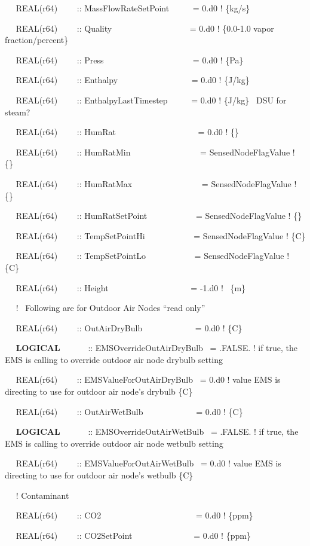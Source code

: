 ~~ REAL(r64)~~~~ :: MassFlowRateSetPoint~~~~~ = 0.d0 ! \{kg/s\}

~~ REAL(r64)~~~~ :: Quality~~~~~~~~~~~~~~~~~~ = 0.d0 ! \{0.0-1.0 vapor fraction/percent\}

~~ REAL(r64)~~~~ :: Press~~~~~ ~~~~~~~~~~~~~~~ = 0.d0 ! \{Pa\}

~~ REAL(r64)~~~~ :: Enthalpy~~~~~~~~~~~~~~~~~ = 0.d0 ! \{J/kg\}

~~ REAL(r64)~~~~ :: EnthalpyLastTimestep~~~~~ = 0.d0 ! \{J/kg\}~ DSU for steam?

~~ REAL(r64)~~~~ :: HumRat~~~~~~~~~~~~~~~~~~~ = 0.d0 ! \{\}

~~ REAL(r64)~~~~ :: HumRatMin~~~~~~~~~~~~~~~~ = SensedNodeFlagValue ! \{\}

~~ REAL(r64)~~~~ :: HumRatMax~~~~~~~~~~~~~~~~ = SensedNodeFlagValue ! \{\}

~~ REAL(r64)~~~~ :: HumRatSetPoint~~~~~~~~~~~ = SensedNodeFlagValue ! \{\}

~~ REAL(r64)~~~~ :: TempSetPointHi~~~~~~~~~~~ = SensedNodeFlagValue ! \{C\}

~~ REAL(r64)~~~~ :: TempSetPointLo~~~~~~~~~~~ = SensedNodeFlagValue ! \{C\}

~~ REAL(r64)~~~~ :: Height~~~~~~~~~~~~~~~~~~~ = -1.d0 !~ \{m\}

~~ !~ Following are for Outdoor Air Nodes ``read only''

~~ REAL(r64)~~~~ :: OutAirDryBulb~~~~~~~~~~~~ = 0.d0 ! \{C\}

~~ \textbf{LOGICAL}~~~~~~ :: EMSOverrideOutAirDryBulb~ = .FALSE. ! if true, the EMS is calling to override outdoor air node drybulb setting

~~ REAL(r64)~~~~ :: EMSValueForOutAirDryBulb~ = 0.d0 ! value EMS is directing to use for outdoor air node's drybulb \{C\}

~~ REAL(r64)~~~~ :: OutAirWetBulb~~~~~~~~~~~~ = 0.d0 ! \{C\}

~~ \textbf{LOGICAL}~~~~~~ :: EMSOverrideOutAirWetBulb~ = .FALSE. ! if true, the EMS is calling to override outdoor air node wetbulb setting

~~ REAL(r64)~~~~ :: EMSValueForOutAirWetBulb~ = 0.d0 ! value EMS is directing to use for outdoor air node's wetbulb \{C\}

~~ ! Contaminant

~~ REAL(r64)~~~~ :: CO2~~~~~~~~~~~~~~~~~~~~~~ = 0.d0 ! \{ppm\}

~~ REAL(r64)~~~~ :: CO2SetPoint~~~~~~~~~~~~~~ = 0.d0 ! \{ppm\}


